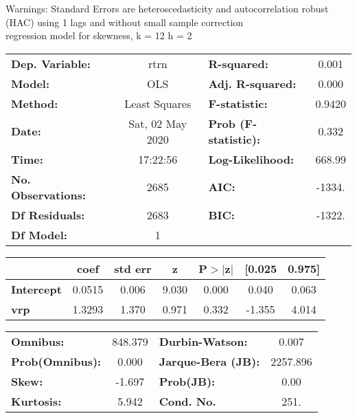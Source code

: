 Warnings: \newline
 [1] Standard Errors are heteroscedasticity and autocorrelation robust (HAC) using 1 lags and without small sample correction\\ 

regression model for skewness, k = 12 h = 2\begin{center}
\begin{tabular}{lclc}
\toprule
\textbf{Dep. Variable:}    &       rtrn       & \textbf{  R-squared:         } &     0.001   \\
\textbf{Model:}            &       OLS        & \textbf{  Adj. R-squared:    } &     0.000   \\
\textbf{Method:}           &  Least Squares   & \textbf{  F-statistic:       } &    0.9420   \\
\textbf{Date:}             & Sat, 02 May 2020 & \textbf{  Prob (F-statistic):} &    0.332    \\
\textbf{Time:}             &     17:22:56     & \textbf{  Log-Likelihood:    } &    668.99   \\
\textbf{No. Observations:} &        2685      & \textbf{  AIC:               } &    -1334.   \\
\textbf{Df Residuals:}     &        2683      & \textbf{  BIC:               } &    -1322.   \\
\textbf{Df Model:}         &           1      & \textbf{                     } &             \\
\bottomrule
\end{tabular}
\begin{tabular}{lcccccc}
                   & \textbf{coef} & \textbf{std err} & \textbf{z} & \textbf{P$> |$z$|$} & \textbf{[0.025} & \textbf{0.975]}  \\
\midrule
\textbf{Intercept} &       0.0515  &        0.006     &     9.030  &         0.000        &        0.040    &        0.063     \\
\textbf{vrp}       &       1.3293  &        1.370     &     0.971  &         0.332        &       -1.355    &        4.014     \\
\bottomrule
\end{tabular}
\begin{tabular}{lclc}
\textbf{Omnibus:}       & 848.379 & \textbf{  Durbin-Watson:     } &    0.007  \\
\textbf{Prob(Omnibus):} &   0.000 & \textbf{  Jarque-Bera (JB):  } & 2257.896  \\
\textbf{Skew:}          &  -1.697 & \textbf{  Prob(JB):          } &     0.00  \\
\textbf{Kurtosis:}      &   5.942 & \textbf{  Cond. No.          } &     251.  \\
\bottomrule
\end{tabular}
\end{center}

